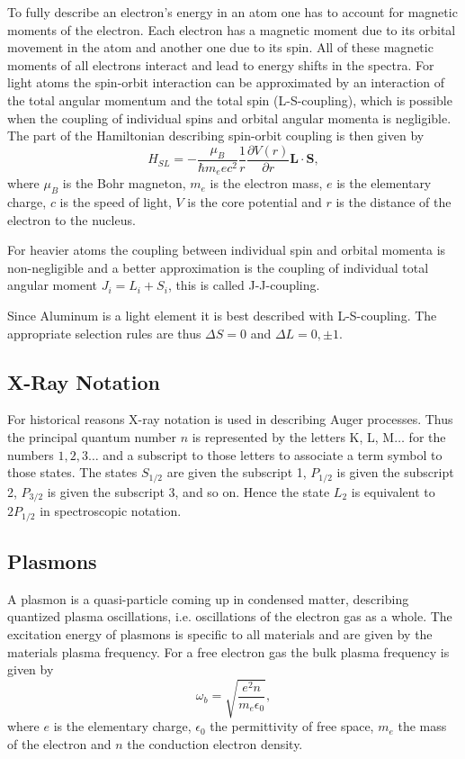 \documentclass[a4paper,10pt]{scrartcl}
\begin{document}
To fully describe an electron's energy in an atom one has to account for magnetic moments of the electron. Each electron has a magnetic moment due to its orbital movement in the atom and another one due to its spin. All of these magnetic moments of all electrons interact and lead to energy shifts in the spectra. For light atoms the spin-orbit interaction can be approximated by an interaction of the total angular momentum and the total spin (L-S-coupling), which is possible when the coupling of individual spins and orbital angular momenta is negligible. The part of the Hamiltonian describing spin-orbit coupling is then given by
\begin{equation}
H_{SL} = - \frac{\mu_B}{\hbar m_e e c^2}\frac{1}{r}\frac{\partial V(r)}{\partial r} \boldsymbol{L}\cdot\boldsymbol{S},
\end{equation}
where $\mu_B$ is the Bohr magneton, $m_e$ is the electron mass, $e$ is the elementary charge, $c$ is the speed of light, $V$ is the core potential and $r$ is the distance of the electron to the nucleus.

For heavier atoms the coupling between individual spin and orbital momenta is non-negligible and a better approximation is the coupling of individual total angular moment $J_i=L_i+S_i$, this is called J-J-coupling.

Since Aluminum is a light element it is best described with L-S-coupling. The appropriate selection rules are thus $\Delta S=0$ and $\Delta L = 0, \pm 1$.

\subsection{X-Ray Notation}

For historical reasons X-ray notation is used in describing Auger processes. Thus the principal quantum number $n$ is represented by the letters K, L, M$\ldots$ for the numbers $1, 2, 3 \ldots$ and a subscript to those letters to associate a term symbol to those states. The states $S_{1/2}$ are given the subscript 1, $P_{1/2}$ is given the subscript 2, $P_{3/2}$ is given the subscript 3, and so on. Hence the state $L_2$ is equivalent to $2P_{1/2}$ in spectroscopic notation.

\subsection{Plasmons}

A plasmon is a quasi-particle coming up in condensed matter, describing quantized plasma oscillations, i.e. oscillations of the electron gas as a whole. The excitation energy of plasmons is specific to all materials and are given by the materials plasma frequency. For a free electron gas the bulk plasma frequency is given by
\begin{equation}
\omega_{b} = \sqrt{\frac{e^2 n}{m_e \epsilon_0}},
\end{equation}
where $e$ is the elementary charge, $\epsilon_0$ the permittivity of free space, $m_e$ the mass of the electron and $n$ the conduction electron density. 
\end{document}
